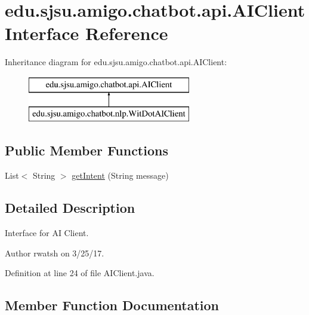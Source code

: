 \hypertarget{interfaceedu_1_1sjsu_1_1amigo_1_1chatbot_1_1api_1_1_a_i_client}{}\section{edu.\+sjsu.\+amigo.\+chatbot.\+api.\+A\+I\+Client Interface Reference}
\label{interfaceedu_1_1sjsu_1_1amigo_1_1chatbot_1_1api_1_1_a_i_client}
Inheritance diagram for edu.\+sjsu.\+amigo.\+chatbot.\+api.\+A\+I\+Client\+:\begin{figure}[H]
\begin{center}
\leavevmode
\includegraphics[height=2.000000cm]{interfaceedu_1_1sjsu_1_1amigo_1_1chatbot_1_1api_1_1_a_i_client}
\end{center}
\end{figure}
\subsection*{Public Member Functions}
\begin{DoxyCompactItemize}
\item 
List$<$ String $>$ \hyperlink{interfaceedu_1_1sjsu_1_1amigo_1_1chatbot_1_1api_1_1_a_i_client_add4a2d03e1538f0abb42197fb94fc9dd}{get\+Intent} (String message)
\end{DoxyCompactItemize}


\subsection{Detailed Description}
Interface for AI Client.

\begin{DoxyAuthor}{Author}
rwatsh on 3/25/17. 
\end{DoxyAuthor}


Definition at line 24 of file A\+I\+Client.\+java.



\subsection{Member Function Documentation}
\mbox{\label{interfaceedu_1_1sjsu_1_1amigo_1_1chatbot_1_1api_1_1_a_i_client_add4a2d03e1538f0abb42197fb94fc9dd}} 

